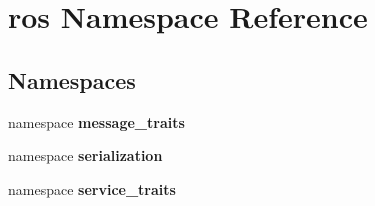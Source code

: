 \section{ros \-Namespace \-Reference}
\label{namespaceros}
\subsection*{\-Namespaces}
\begin{DoxyCompactItemize}
\item 
namespace {\bf message\-\_\-traits}
\item 
namespace {\bf serialization}
\item 
namespace {\bf service\-\_\-traits}
\end{DoxyCompactItemize}
